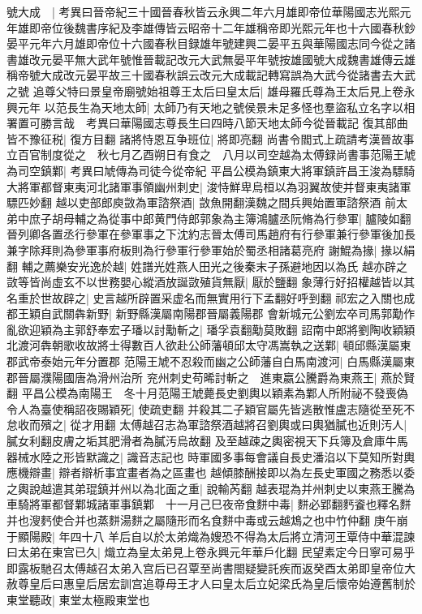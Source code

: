 號大成　|{
	考異曰晉帝紀三十國晉春秋皆云永興二年六月雄即帝位華陽國志光熙元年雄即帝位後魏書序紀及李雄傳皆云昭帝十二年雄稱帝即光熙元年也十六國春秋鈔晏平元年六月雄即帝位十六國春秋目録雄年號建興二晏平五與華陽國志同今從之諸書雄改元晏平無大武年號惟晉載記改元大武無晏平年號按雄國號大成魏書雄傳云雄稱帝號大成改元晏平故三十國春秋誤云改元大成載記轉寫誤為大武今從諸書去大武之號}
追尊父特曰景皇帝廟號始祖尊王太后曰皇太后|{
	雄母羅氏尊為王太后見上卷永興元年}
以范長生為天地太師|{
	太師乃有天地之號侯景未足多怪也羣盜私立名字以相署置可勝言哉　考異曰華陽國志尊長生曰四時八節天地太師今從晉載記}
復其部曲皆不豫征税|{
	復方目翻}
諸將恃恩互争班位|{
	將即亮翻}
尚書令閻式上疏請考漢晉故事立百官制度從之　秋七月乙酉朔日有食之　八月以司空越為太傅録尚書事范陽王虓為司空鎮鄴|{
	考異曰虓傳為司徒今從帝紀}
平昌公模為鎮東大將軍鎮許昌王浚為驃騎大將軍都督東夷河北諸軍事領幽州刺史|{
	浚恃鮮卑烏桓以為羽翼故使并督東夷諸軍驃匹妙翻}
越以吏部郎庾敳為軍諮祭酒|{
	敳魚開翻漢魏之間兵興始置軍諮祭酒}
前太弟中庶子胡母輔之為從事中郎黄門侍郎郭象為主簿鴻臚丞阮脩為行參軍|{
	臚陵如翻晉列卿各置丞行參軍在參軍事之下沈約志晉太傅司馬趙府有行參軍兼行參軍後加長兼字除拜則為參軍事府板則為行參軍行參軍始於蜀丞相諸葛亮府}
謝鯤為掾|{
	掾以絹翻}
輔之薦樂安光逸於越|{
	姓譜光姓燕人田光之後秦末子孫避地因以為氏}
越亦辟之敳等皆尚虛玄不以世務嬰心縱酒放誕敳殖貨無厭|{
	厭於鹽翻}
象薄行好招權越皆以其名重於世故辟之|{
	史言越所辟置采虚名而無實用行下孟翻好呼到翻}
祁宏之入關也成都王穎自武關犇新野|{
	新野縣漢屬南陽郡晉屬義陽郡}
會新城元公劉宏卒司馬郭勱作亂欲迎穎為主郭舒奉宏子璠以討勱斬之|{
	璠孚袁翻勱莫敗翻}
詔南中郎將劉陶收穎穎北渡河犇朝歌收故將士得數百人欲赴公師藩頓邱太守馮嵩執之送鄴|{
	頓邱縣漢屬東郡武帝泰始元年分置郡}
范陽王虓不忍殺而幽之公師藩自白馬南渡河|{
	白馬縣漢屬東郡晉屬濮陽國唐為滑州治所}
兖州刺史苟晞討斬之　進東嬴公騰爵為東燕王|{
	燕於賢翻}
平昌公模為南陽王　冬十月范陽王虓薨長史劉輿以穎素為鄴人所附祕不發喪偽令人為臺使稱詔夜賜穎死|{
	使疏吏翻}
并殺其二子穎官屬先皆逃散惟盧志隨從至死不怠收而殯之|{
	從才用翻}
太傅越召志為軍諮祭酒越將召劉輿或曰輿猶膩也近則汚人|{
	膩女利翻皮膚之垢其肥滑者為膩汚烏故翻}
及至越疎之輿密視天下兵簿及倉庫牛馬器械水陸之形皆默識之|{
	識音志記也}
時軍國多事每會議自長史潘淊以下莫知所對輿應機辯畫|{
	辯者辯析事宜畫者為之區畫也}
越傾膝酬接即以為左長史軍國之務悉以委之輿說越遣其弟琨鎮并州以為北面之重|{
	說輸芮翻}
越表琨為并州刺史以東燕王騰為車騎將軍都督鄴城諸軍事鎮鄴　十一月己巳夜帝食䴵中毒|{
	䴵必郢翻麫餈也釋名䴵并也溲麫使合并也蒸䴵湯䴵之屬隨形而名食䴵中毒或云越鴆之也中竹仲翻}
庚午崩于顯陽殿|{
	年四十八}
羊后自以於太弟熾為嫂恐不得為太后將立清河王覃侍中華混諫曰太弟在東宫已久|{
	熾立為皇太弟見上卷永興元年華戶化翻}
民望素定今日寧可易乎即露板馳召太傅越召太弟入宫后已召覃至尚書閤疑變託疾而返癸酉太弟即皇帝位大赦尊皇后曰惠皇后居宏訓宫追尊母王才人曰皇太后立妃梁氏為皇后懷帝始遵舊制於東堂聽政|{
	東堂太極殿東堂也}
